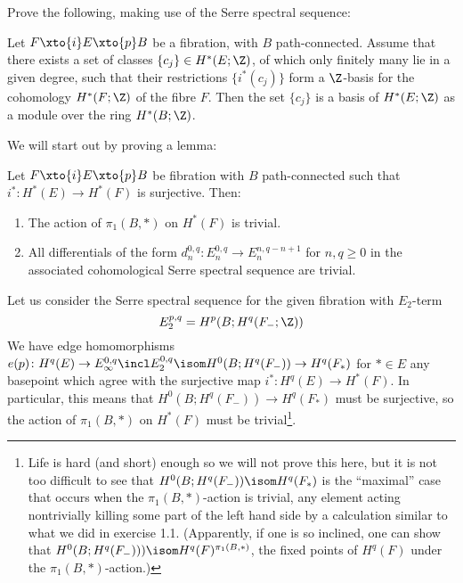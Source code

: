 \begin{exercise}
	Prove the following, making use of the Serre spectral sequence:
	\begin{theorem}
		Let $F \xto{i} E \xto{p} B$ be a fibration, with $B$ path-connected.
		Assume that there exists a set of classes $\{c_j\} \in H^*(E; \Z)$, of which only finitely many lie in a given degree, such that their restrictions $\{i^*(c_j)\}$ form a $\Z$-basis for the cohomology $H^*(F; \Z)$ of the fibre $F$.
		Then the set $\{c_j\}$ is a basis of $H^*(E; \Z)$ as a module over the ring $H^*(B; \Z)$.
	\end{theorem}
\end{exercise}
\begin{solution}
	We will start out by proving a lemma:
	\begin{lemma}
		Let $F \xto{i} E \xto{p} B$ be fibration with $B$ path-connected such that $i^*\colon H^*(E) \to H^*(F)$ is surjective.
		Then:
		\begin{enumerate}
			\item The action of $\pi_1(B, *)$ on $H^*(F)$ is trivial.
			\item All differentials of the form $d_n^{0, q}\colon E_n^{0, q} \to E_n^{n, q - n + 1}$ for $n, q \geq 0$ in the associated cohomological Serre spectral sequence are trivial.
		\end{enumerate}
	\end{lemma}
	\begin{smallproof}
		Let us consider the Serre spectral sequence for the given fibration with $E_2$-term
		\begin{equation*}
			E_2^{p, q} = H^p(B; H^q(F_{-}; \Z))
		\end{equation*}
		We have edge homomorphisms $e(p)\colon H^q(E) \to E_\infty^{0, q} \incl E_2^{0, q} \isom H^0(B; H^q(F_{-})) \to H^q(F_*)$ for $* \in E$ any basepoint which agree with the surjective map $i^*\colon H^q(E) \to H^*(F)$.
		In particular, this means that $H^0(B; H^q(F_{-})) \to H^q(F_*)$ must be surjective, so the action of $\pi_1(B, *)$ on $H^*(F)$ must be trivial\footnote{Life is hard (and short) enough so we will not prove this here, but it is not too difficult to see that $H^0(B; H^q(F_{-})) \isom H^q(F_*)$ is the \enquote{maximal} case that occurs when the $\pi_1(B, *)$-action is trivial, any element acting nontrivially killing some part of the left hand side by a calculation similar to what we did in exercise 1.1. (Apparently, if one is so inclined, one can show that $H^0(B; H^q(F_{-}))) \isom H^q(F)^{\pi_1(B, *)}$, the fixed points of $H^q(F)$ under the $\pi_1(B, *)$-action.)}.
		

\end{smallproof}
\end{solution}
